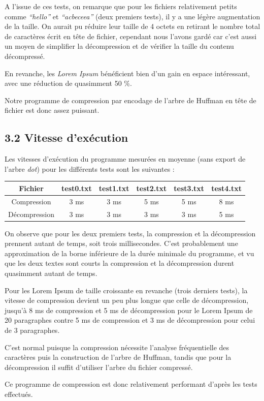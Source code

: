 \documentclass [a4paper,11pt] {report}
\begin{document}
\newpage

A l'issue de ces tests, on remarque que pour les fichiers relativement petits comme \textit{``hello''} et \textit{``acbeceea''} (deux premiers tests), il y a une légère augmentation de la taille. On aurait pu réduire leur taille de 4 octets en retirant le nombre total de caractères écrit en tête de fichier, cependant nous l'avons gardé car c'est aussi un moyen de simplifier la décompression et de vérifier la taille du contenu décompressé.

En revanche, les \textit{Lorem Ipsum} bénéficient bien d'un gain en espace intéressant, avec une réduction de quasimment 50 \%.

Notre programme de compression par encodage de l'arbre de Huffman en tête de fichier est donc assez puissant.


\subsection* {3.2\hspace{3mm} Vitesse d'exécution}

Les vitesses d'exécution du programme mesurées en moyenne (sans export de l'arbre \textit{dot}) pour les différents tests sont les suivantes :
\begin{center}
\begin{tabular}{|c|c|c|c|c|c|}
 \hline
Fichier & test0.txt & test1.txt & test2.txt & test3.txt & test4.txt\\
 \hline
Compression & 3 ms & 3 ms & 5 ms & 5 ms & 8 ms\\
Décompression & 3 ms & 3 ms & 3 ms & 3 ms & 5 ms\\
 \hline
\end{tabular}
\end{center}
\vspace{0.25cm}

On observe que pour les deux premiers tests, la compression et la décompression prennent autant de temps, soit trois millisecondes. C'est probablement une approximation de la borne inférieure de la durée minimale du programme, et vu que les deux textes sont courts la compression et la décompression durent quasimment autant de temps.

Pour les Lorem Ipsum de taille croissante en revanche (trois derniers tests), la vitesse de compression devient un peu plus longue que celle de décompression, jusqu'à 8 ms de compression et 5 ms de décompression pour le Lorem Ipsum de 20 paragraphes contre 5 ms de compression et 3 ms de décompression pour celui de 3 paragraphes.

C'est normal puisque la compression nécessite l'analyse fréquentielle des caractères puis la construction de l'arbre de Huffman, tandis que pour la décompression il suffit d'utiliser l'arbre du fichier compressé.

Ce programme de compression est donc relativement performant d'après les tests effectués.
\end{document}
